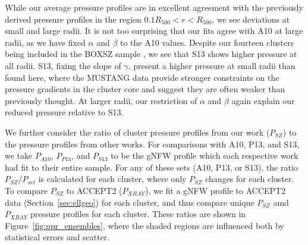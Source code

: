 \documentclass[iop,numberedappendix,apj]{emulateapj}
\begin{document}

While our average pressure profiles are in excellent agreement with the previously derived pressure profiles
in the region $0.1 R_{500} < r < R_{500}$, we see deviations at small and large radii. It is not too surprising
that our fits agree with A10 at large radii, as we have fixed $\alpha$ and $\beta$ to the A10 values. Despite our
fourteen clusters being included in the BOXSZ sample \citep{sayers2013}, we see that S13 shows higher pressure
at all radii. 
S13, fixing the slope of $\gamma$, present a higher pressure at small radii than found here, where the MUSTANG
data provide stronger constraints on the pressure gradients in the cluster core and suggest they are often weaker
than previously thought. 
At larger radii, our restriction of $\alpha$ and $\beta$ again explain our reduced pressure relative
to S13.


We further consider the ratio of cluster pressure profiles from our work ($P_{SZ}$) to the pressure profiles from 
other works. For comparisons with A10, P13, and S13, we take $P_{A10}$, $P_{P13}$, and $P_{S13}$ to be the gNFW
profile which each respective work had fit to their entire sample. For any of these sets (A10, P13, or S13), 
the ratio $P_{SZ} / P_{set}$ is calculated for each cluster, where only $P_{SZ}$ changes for each cluster. To
compare $P_{SZ}$ to ACCEPT2 ($P_{XRAY}$), we fit a gNFW profile to ACCEPT2 data (Section~\ref{sec:ellgeo}) for
each cluster, and thus compare unique $P_{SZ}$ amd $P_{XRAY}$ pressure profiles for each cluster. These ratios are
shown in Figure~\ref{fig:ppr_ensembles}, where the shaded regions are influenced both by statistical errors and
scatter.
\end{document}
